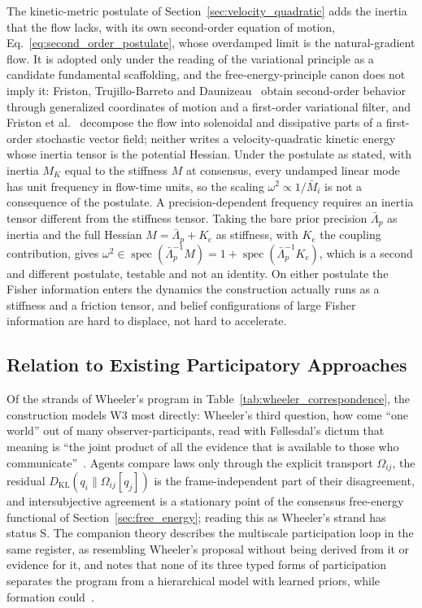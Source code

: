 The kinetic-metric postulate of Section~\ref{sec:velocity_quadratic} adds the inertia that the flow lacks, with its own second-order equation of motion, Eq.~\eqref{eq:second_order_postulate}, whose overdamped limit is the natural-gradient flow. It is adopted only under the reading of the variational principle as a candidate fundamental scaffolding, and the free-energy-principle canon does not imply it: Friston, Trujillo-Barreto and Daunizeau~\cite{Friston2008DEM} obtain second-order behavior through generalized coordinates of motion and a first-order variational filter, and Friston et al.~\cite{Friston2023PhysReports} decompose the flow into solenoidal and dissipative parts of a first-order stochastic vector field; neither writes a velocity-quadratic kinetic energy whose inertia tensor is the potential Hessian. Under the postulate as stated, with inertia $M_K$ equal to the stiffness $M$ at consensus, every undamped linear mode has unit frequency in flow-time units, so the scaling $\omega^2 \propto 1/\bar{M}_i$ is not a consequence of the postulate. A precision-dependent frequency requires an inertia tensor different from the stiffness tensor. Taking the bare prior precision $\bar{\Lambda}_p$ as inertia and the full Hessian $M = \bar{\Lambda}_p + K_{\mathrm{c}}$ as stiffness, with $K_{\mathrm{c}}$ the coupling contribution, gives $\omega^2 \in \operatorname{spec}(\bar{\Lambda}_p^{-1}M) = 1 + \operatorname{spec}(\bar{\Lambda}_p^{-1}K_{\mathrm{c}})$, which is a second and different postulate, testable and not an identity. On either postulate the Fisher information enters the dynamics the construction actually runs as a stiffness and a friction tensor, and belief configurations of large Fisher information are hard to displace, not hard to accelerate.

\subsection{Relation to Existing Participatory Approaches}

Of the strands of Wheeler's program in Table~\ref{tab:wheeler_correspondence}, the construction models W3 most directly: Wheeler's third question, how come ``one world'' out of many observer-participants, read with F{\o}llesdal's dictum that meaning is ``the joint product of all the evidence that is available to those who communicate''~\cite{Wheeler1990}. Agents compare laws only through the explicit transport $\Omega_{ij}$, the residual $D_{\mathrm{KL}}(q_i\|\Omega_{ij}[q_j])$ is the frame-independent part of their disagreement, and intersubjective agreement is a stationary point of the consensus free-energy functional of Section~\ref{sec:free_energy}; reading this as Wheeler's strand has status S. The companion theory describes the multiscale participation loop in the same register, as resembling Wheeler's proposal without being derived from it or evidence for it, and notes that none of its three typed forms of participation separates the program from a hierarchical model with learned priors, while formation could~\cite[Ch.~14]{DennisGaugeVFE2026}.

